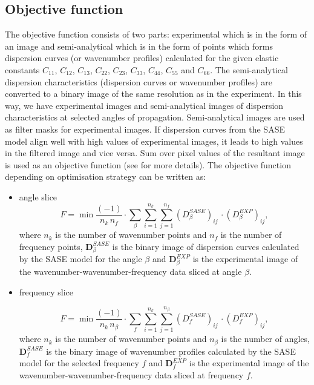 \documentclass[preprint,12pt]{elsarticle}
\newcommand{\matr}[1]{\mathbf{#1}} %
\begin{document}
\subsection{Objective function}
The objective function consists of two parts: experimental which is in the form of an image and semi-analytical which is in the form of points which forms dispersion curves (or wavenumber profiles) calculated for the given elastic constants $C_{11}$, $C_{12}$, $C_{13}$, $C_{22}$, $C_{23}$, $C_{33}$, $C_{44}$, $C_{55}$ and $C_{66}$.
The semi-analytical dispersion characteristics (dispersion curves or wavenumber profiles) are converted to a binary image of the same resolution as in the experiment. 
In this way, we have experimental images and semi-analytical images of dispersion characteristics at selected angles of propagation. 
Semi-analytical images are used as filter masks for experimental images.
If dispersion curves from the SASE model align well with high values of experimental images, it leads to high values in the filtered image and vice versa.
Sum over pixel values of the resultant image is used as an objective function (see \cite{Kudela2020} for more details).
The objective function depending on optimisation strategy can be written as:
\begin{itemize}
	\item angle slice
\begin{equation}
	F=\min \frac{(-1)}{n_k \, n_f} \cdot \sum_{\beta} \sum_{i=1}^{n_k} \sum_{j=1}^{n_f} (D_{\beta}^{SASE})_{ij} \, \cdot (D_{\beta}^{EXP})_{ij},
	\label{eq:obj_fun_beta}
\end{equation}
where \(n_k\) is the number of wavenumber points and \(n_f\) is the number of frequency points, $\matr{D}_{\beta}^{SASE}$ is the binary image of dispersion curves calculated by the SASE model for the angle $\beta$ and $\matr{D}_{\beta}^{EXP}$ is the experimental image of the wavenumber-wavenumber-frequency data sliced at angle $\beta$.

\item frequency slice

\begin{equation}
	F=\min \frac{(-1)}{n_k \, n_{\beta}} \cdot \sum_{f} \sum_{i=1}^{n_k} \sum_{j=1}^{n_{\beta}} (D_{f}^{SASE})_{ij} \, \cdot (D_{f}^{EXP})_{ij},
	\label{eq:obj_fun_freq}
\end{equation}
where \(n_k\) is the number of wavenumber points and \(n_{\beta}\) is the number of angles, $\matr{D}_{f}^{SASE}$ is the binary image of wavenumber profiles calculated by the SASE model for the selected frequency $f$ and $\matr{D}_{f}^{EXP}$ is the experimental image of the wavenumber-wavenumber-frequency data sliced at frequency $f$.
\end{itemize}
\end{document}
